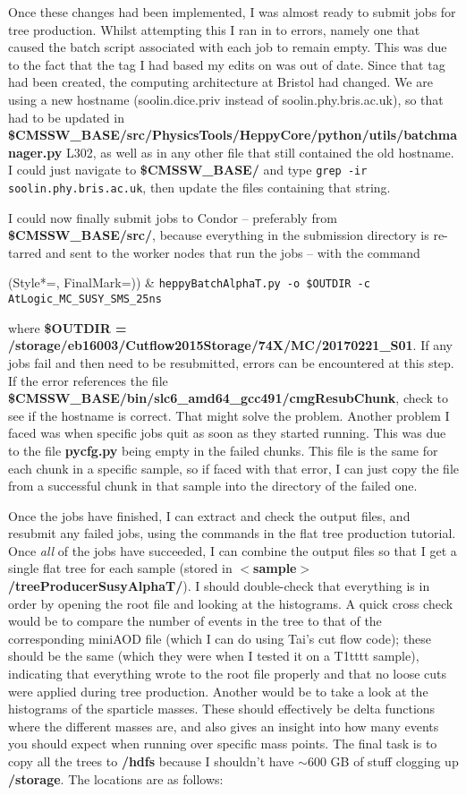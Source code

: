 Once these changes had been implemented, I was almost ready to submit jobs for tree production. Whilst attempting this I ran in to errors, namely one that caused the batch script associated with each job to remain empty. This was due to the fact that the tag I had based my edits on was out of date. Since that tag had been created, the computing architecture at Bristol had changed. We are using a new hostname (soolin.dice.priv instead of soolin.phy.bris.ac.uk), so that had to be updated in \textbf{\$CMSSW\_BASE/src/PhysicsTools/HeppyCore/python/utils/batchmanager.py} L302, as well as in any other file that still contained the old hostname. I could just navigate to \textbf{\$CMSSW\_BASE/} and type \texttt{grep -ir soolin.phy.bris.ac.uk}, then update the files containing that string.

I could now finally submit jobs to Condor -- preferably from \textbf{\$CMSSW\_BASE/src/}, because everything in the submission directory is re-tarred and sent to the worker nodes that run the jobs -- with the command

\begin{easylist}[itemize]
\ListProperties(Style*=, FinalMark={)})
& \texttt{heppyBatchAlphaT.py -o \$OUTDIR -c AtLogic\_MC\_SUSY\_SMS\_25ns}
\end{easylist}

where \textbf{\$OUTDIR = /storage/eb16003/Cutflow2015Storage/74X/MC/20170221\_S01}. If any jobs fail and then need to be resubmitted, errors can be encountered at this step. If the error references the file \textbf{\$CMSSW\_BASE/bin/slc6\_amd64\_gcc491/cmgResubChunk}, check to see if the hostname is correct. That might solve the problem. Another problem I faced was when specific jobs quit as soon as they started running. This was due to the file \textbf{pycfg.py} being empty in the failed chunks. This file is the same for each chunk in a specific sample, so if faced with that error, I can just copy the file from a successful chunk in that sample into the directory of the failed one.

Once the jobs have finished, I can extract and check the output files, and resubmit any failed jobs, using the commands in the flat tree production tutorial. Once \emph{all} of the jobs have succeeded, I can combine the output files so that I get a single flat tree for each sample (stored in \textbf{$<$sample$>$/treeProducerSusyAlphaT/}). I should double-check that everything is in order by opening the root file and looking at the histograms. A quick cross check would be to compare the number of events in the tree to that of the corresponding miniAOD file (which I can do using Tai's cut flow code); these should be the same (which they were when I tested it on a T1tttt sample), indicating that everything wrote to the root file properly and that no loose cuts were applied during tree production. Another would be to take a look at the histograms of the sparticle masses. These should effectively be delta functions where the different masses are, and also gives an insight into how many events you should expect when running over specific mass points. The final task is to copy all the trees to \textbf{/hdfs} because I shouldn't have $\sim 600$ GB of stuff clogging up \textbf{/storage}. The locations are as follows:

